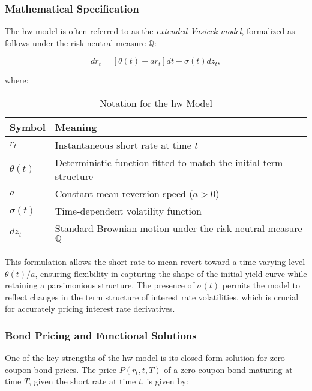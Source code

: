 \subsubsection{Mathematical Specification}
The \ac{hw} model is often referred to as the \textit{extended Vasicek model}, formalized as follows under the risk-neutral measure \( \mathbb{Q} \):

\begin{equation}
	dr_t = \left[ \theta(t) - a r_t \right] dt + \sigma(t) dz_t,
\end{equation}

where:
\begin{table}[H]
	\centering
	\caption{Notation for the \ac{hw} Model}
	\begin{tabular}{ll}
		\toprule
		\textbf{Symbol} & \textbf{Meaning}                                                     \\
		\midrule
		$r_t$           & Instantaneous short rate at time $t$                                 \\
		$\theta(t)$     & Deterministic function fitted to match the initial term structure    \\
		$a$             & Constant mean reversion speed ($a > 0$)                              \\
		$\sigma(t)$     & Time-dependent volatility function                                   \\
		$dz_t$          & Standard Brownian motion under the risk-neutral measure $\mathbb{Q}$ \\
		\bottomrule
	\end{tabular}
\end{table}

This formulation allows the short rate to mean-revert toward a time-varying level \( \theta(t)/a \), ensuring flexibility in capturing the shape of the initial yield curve while retaining a parsimonious structure. The presence of \( \sigma(t) \) permits the model to reflect changes in the term structure of interest rate volatilities, which is crucial for accurately pricing interest rate derivatives.

\subsubsection{Bond Pricing and Functional Solutions}
\label{subsubsec:bond_pricing_hw}
One of the key strengths of the \ac{hw} model is its closed-form solution for zero-coupon bond prices. The price \( P(r_t, t, T) \) of a zero-coupon bond maturing at time \( T \), given the short rate at time \( t \), is given by:

